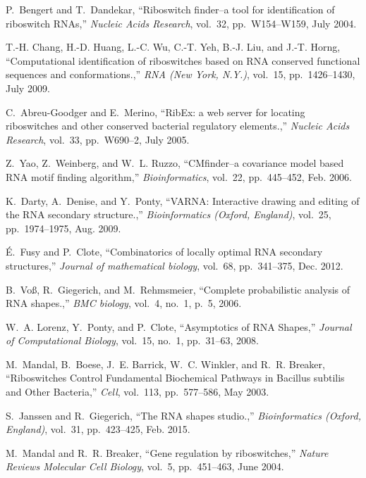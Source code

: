 \documentclass[11pt, oneside]{Thesis} %
\begin{document}
\begin{thebibliography}{100}
P.~Bengert and T.~Dandekar, ``{Riboswitch finder--a tool for identification of
  riboswitch RNAs},'' {\em Nucleic Acids Research}, vol.~32, pp.~W154--W159,
  July 2004.

T.-H. Chang, H.-D. Huang, L.-C. Wu, C.-T. Yeh, B.-J. Liu, and J.-T. Horng,
  ``{Computational identification of riboswitches based on RNA conserved
  functional sequences and conformations.},'' {\em RNA (New York, N.Y.)},
  vol.~15, pp.~1426--1430, July 2009.

C.~Abreu-Goodger and E.~Merino, ``{RibEx: a web server for locating
  riboswitches and other conserved bacterial regulatory elements.},'' {\em
  Nucleic Acids Research}, vol.~33, pp.~W690--2, July 2005.

Z.~Yao, Z.~Weinberg, and W.~L. Ruzzo, ``{CMfinder--a covariance model based RNA
  motif finding algorithm},'' {\em Bioinformatics}, vol.~22, pp.~445--452, Feb.
  2006.

K.~Darty, A.~Denise, and Y.~Ponty, ``{VARNA: Interactive drawing and editing of
  the RNA secondary structure.},'' {\em Bioinformatics (Oxford, England)},
  vol.~25, pp.~1974--1975, Aug. 2009.

{\'E}.~Fusy and P.~Clote, ``{Combinatorics of locally optimal RNA secondary
  structures},'' {\em Journal of mathematical biology}, vol.~68, pp.~341--375,
  Dec. 2012.

B.~Vo{\ss}, R.~Giegerich, and M.~Rehmsmeier, ``{Complete probabilistic analysis
  of RNA shapes.},'' {\em BMC biology}, vol.~4, no.~1, p.~5, 2006.

W.~A. Lorenz, Y.~Ponty, and P.~Clote, ``{Asymptotics of RNA Shapes},'' {\em
  Journal of Computational Biology}, vol.~15, no.~1, pp.~31--63, 2008.

M.~Mandal, B.~Boese, J.~E. Barrick, W.~C. Winkler, and R.~R. Breaker,
  ``{Riboswitches Control Fundamental Biochemical Pathways in Bacillus subtilis
  and Other Bacteria},'' {\em Cell}, vol.~113, pp.~577--586, May 2003.

S.~Janssen and R.~Giegerich, ``{The RNA shapes studio.},'' {\em Bioinformatics
  (Oxford, England)}, vol.~31, pp.~423--425, Feb. 2015.

M.~Mandal and R.~R. Breaker, ``{Gene regulation by riboswitches},'' {\em Nature
  Reviews Molecular Cell Biology}, vol.~5, pp.~451--463, June 2004.


\end{thebibliography}
\end{document}
